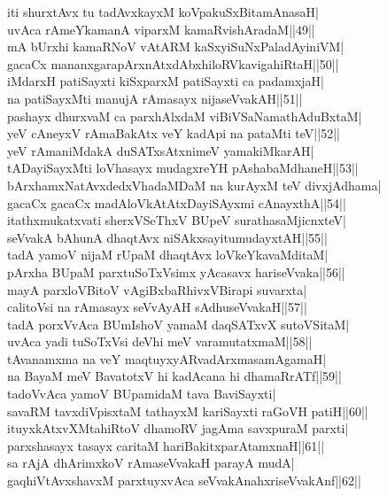 \documentclass{article}
\begin{document}
iti shurxtAvx tu tadAvxkayxM koVpakuSxBitamAnasaH|\\
uvAca rAmeYkamanA viparxM kamaRvishAradaM||49||\\
mA bUrxhi kamaRNoV vAtARM kaSxyiSuNxPaladAyiniVM|\\
gacaCx mananxgarapArxnAtxdAbxhiloRVkavigahiRtaH||50||\\
iMdarxH patiSayxti kiSxparxM patiSayxti ca padamxjaH|\\
na patiSayxMti manujA rAmasayx nijaseVvakAH||51||\\
pashayx dhurxvaM ca parxhAlxdaM viBiVSaNamathAduBxtaM|\\
yeV cAneyxV rAmaBakAtx veY kadApi na pataMti teV||52||\\
yeV rAmaniMdakA duSATxsAtxnimeV yamakiMkarAH|\\
tADayiSayxMti loVhasayx mudagxreYH pAshabaMdhaneH||53||\\
bArxhamxNatAvxdedxVhadaMDaM na kurAyxM teV divxjAdhama|\\
gacaCx gacaCx madAloVkAtAtxDayiSAyxmi cAnayxthA||54||\\
itathxmukatxvati sherxVSeThxV BUpeV surathasaMjicnxteV|\\
seVvakA bAhunA dhaqtAvx niSAkxsayitumudayxtAH||55||\\
tadA yamoV nijaM rUpaM dhaqtAvx loVkeYkavaMditaM|\\
pArxha BUpaM parxtuSoTxVsimx yAcasavx hariseVvaka||56||\\
mayA parxloVBitoV vAgiBxbaRhivxVBirapi suvarxta|\\
calitoVsi na rAmasayx seVvAyAH sAdhuseVvakaH||57||\\
tadA porxVvAca BUmIshoV yamaM daqSATxvX sutoVSitaM|\\
uvAca yadi tuSoTxVsi deVhi meV varamutatxmaM||58||\\
tAvanamxma na veY maqtuyxyARvadArxmasamAgamaH|\\
na BayaM meV BavatotxV hi kadAcana hi dhamaRrATf||59||\\
tadoVvAca yamoV BUpamidaM tava BaviSayxti|\\
savaRM tavxdiVpisxtaM tathayxM kariSayxti raGoVH patiH||60||\\
ituyxkAtxvXMtahiRtoV dhamoRV jagAma savxpuraM parxti|\\
parxshasayx tasayx caritaM hariBakitxparAtamxnaH||61||\\
sa rAjA dhArimxkoV rAmaseVvakaH parayA mudA|\\
gaqhiVtAvxshavxM parxtuyxvAca seVvakAnahxriseVvakAnf||62||\\
\end{document}
